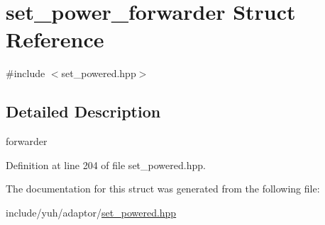 \hypertarget{structyuh_1_1range__detail_1_1set__power__forwarder}{\section{set\-\_\-power\-\_\-forwarder \-Struct \-Reference}
\label{d4/d42/structyuh_1_1range__detail_1_1set__power__forwarder}
}


{\ttfamily \#include $<$set\-\_\-powered.\-hpp$>$}



\subsection{\-Detailed \-Description}
forwarder 

\-Definition at line 204 of file set\-\_\-powered.\-hpp.



\-The documentation for this struct was generated from the following file\-:\begin{DoxyCompactItemize}
\item 
include/yuh/adaptor/\hyperlink{set__powered_8hpp}{set\-\_\-powered.\-hpp}\end{DoxyCompactItemize}
